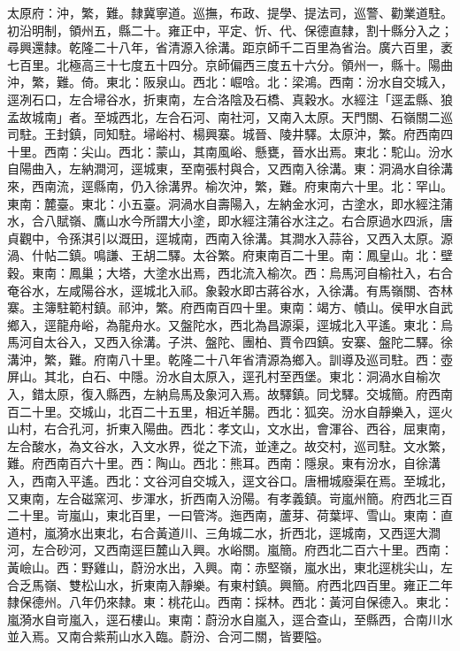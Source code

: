 \begin{pinyinscope}
太原府：沖，繁，難。隸冀寧道。巡撫，布政、提學、提法司，巡警、勸業道駐。初沿明制，領州五，縣二十。雍正中，平定、忻、代、保德直隸，割十縣分入之；尋興還隸。乾隆二十八年，省清源入徐溝。距京師千二百里為省治。廣六百里，袤七百里。北極高三十七度五十四分。京師偏西三度五十六分。領州一，縣十。陽曲沖，繁，難。倚。東北：阪泉山。西北：崛唅。北：梁鴻。西南：汾水自交城入，逕冽石口，左合埽谷水，折東南，左合洛陰及石橋、真穀水。水經注「逕盂縣、狼孟故城南」者。至城西北，左合石河、南社河，又南入太原。天門關、石嶺關二巡司駐。王封鎮，同知駐。埽峪村、楊興寨。城晉、陵井驛。太原沖，繁。府西南四十里。西南：尖山。西北：蒙山，其南風峪、懸甕，晉水出焉。東北：駝山。汾水自陽曲入，左納澗河，逕城東，至南張村與合，又西南入徐溝。東：洞渦水自徐溝來，西南流，逕縣南，仍入徐溝界。榆次沖，繁，難。府東南六十里。北：罕山。東南：麓臺。東北：小五臺。洞渦水自壽陽入，左納金水河，古塗水，即水經注蒲水，合八賦嶺、鷹山水今所謂大小塗，即水經注蒲谷水注之。右合原過水四派，唐貞觀中，令孫淇引以溉田，逕城南，西南入徐溝。其澗水入蒜谷，又西入太原。源渦、什帖二鎮。鳴謙、王胡二驛。太谷繁。府東南百二十里。南：鳳皇山。北：壁穀。東南：鳳巢；大塔，大塗水出焉，西北流入榆次。西：烏馬河自榆社入，右合奄谷水，左咸陽谷水，逕城北入祁。象穀水即古蔣谷水，入徐溝。有馬嶺關、杏林寨。主簿駐範村鎮。祁沖，繁。府西南百四十里。東南：竭方、幘山。侯甲水自武鄉入，逕龍舟峪，為龍舟水。又盤陀水，西北為昌源渠，逕城北入平遙。東北：烏馬河自太谷入，又西入徐溝。子洪、盤陀、團柏、賈令四鎮。安寨、盤陀二驛。徐溝沖，繁，難。府南八十里。乾隆二十八年省清源為鄉入。訓導及巡司駐。西：壺屏山。其北，白石、中隱。汾水自太原入，逕孔村至西堡。東北：洞渦水自榆次入，錯太原，復入縣西，左納烏馬及象河入焉。故驛鎮。同戈驛。交城簡。府西南百二十里。交城山，北百二十五里，相近羊腸。西北：狐突。汾水自靜樂入，逕火山村，右合孔河，折東入陽曲。西北：孝文山，文水出，會渾谷、西谷，屈東南，左合酸水，為文谷水，入文水界，從之下流，並達之。故交村，巡司駐。文水繁，難。府西南百六十里。西：陶山。西北：熊耳。西南：隱泉。東有汾水，自徐溝入，西南入平遙。西北：文谷河自交城入，逕文谷口。唐柵城廢渠在焉。至城北，又東南，左合磁窯河、步渾水，折西南入汾陽。有孝義鎮。岢嵐州簡。府西北三百二十里。岢嵐山，東北百里，一曰管涔。迤西南，蘆芽、荷葉坪、雪山。東南：直道村，嵐漪水出東北，右合黃道川、三角城二水，折西北，逕城南，又西逕大澗河，左合砂河，又西南逕巨麓山入興。水峪關。嵐簡。府西北二百六十里。西南：黃嶮山。西：野雞山，蔚汾水出，入興。南：赤堅嶺，嵐水出，東北逕桃尖山，左合乏馬嶺、雙松山水，折東南入靜樂。有東村鎮。興簡。府西北四百里。雍正二年隸保德州。八年仍來隸。東：桃花山。西南：採林。西北：黃河自保德入。東北：嵐漪水自岢嵐入，逕石樓山。東南：蔚汾水自嵐入，逕合查山，至縣西，合南川水並入焉。又南合紫荊山水入臨。蔚汾、合河二關，皆要隘。


\end{pinyinscope}
